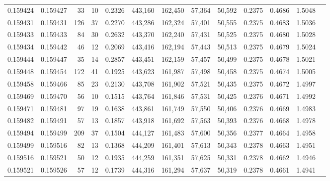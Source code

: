 \begin{tabular}{rrrrrrrrrrrrr}
0.159424 & 0.159427 &    33 &  10 &                                     0.2326 & 443,160 & 162,450 &  57,364 &  50,592 & 0.2375 & 0.4686 & 1.5048 \\
0.159431 & 0.159431 &   126 &  37 &                                     0.2270 & 443,286 & 162,324 &  57,401 &  50,555 & 0.2375 & 0.4683 & 1.5036 \\
0.159433 & 0.159433 &    84 &  30 &                                     0.2632 & 443,370 & 162,240 &  57,431 &  50,525 & 0.2375 & 0.4680 & 1.5028 \\
0.159434 & 0.159442 &    46 &  12 &                                     0.2069 & 443,416 & 162,194 &  57,443 &  50,513 & 0.2375 & 0.4679 & 1.5024 \\
0.159444 & 0.159447 &    35 &  14 &                                     0.2857 & 443,451 & 162,159 &  57,457 &  50,499 & 0.2375 & 0.4678 & 1.5021 \\
0.159448 & 0.159454 &   172 &  41 &                                     0.1925 & 443,623 & 161,987 &  57,498 &  50,458 & 0.2375 & 0.4674 & 1.5005 \\
0.159458 & 0.159466 &    85 &  23 &                                     0.2130 & 443,708 & 161,902 &  57,521 &  50,435 & 0.2375 & 0.4672 & 1.4997 \\
0.159469 & 0.159470 &    56 &  10 &                                     0.1515 & 443,764 & 161,846 &  57,531 &  50,425 & 0.2376 & 0.4671 & 1.4992 \\
0.159471 & 0.159481 &    97 &  19 &                                     0.1638 & 443,861 & 161,749 &  57,550 &  50,406 & 0.2376 & 0.4669 & 1.4983 \\
0.159482 & 0.159491 &    57 &  13 &                                     0.1857 & 443,918 & 161,692 &  57,563 &  50,393 & 0.2376 & 0.4668 & 1.4978 \\
0.159494 & 0.159499 &   209 &  37 &                                     0.1504 & 444,127 & 161,483 &  57,600 &  50,356 & 0.2377 & 0.4664 & 1.4958 \\
0.159499 & 0.159516 &    82 &  13 &                                     0.1368 & 444,209 & 161,401 &  57,613 &  50,343 & 0.2378 & 0.4663 & 1.4951 \\
0.159516 & 0.159521 &    50 &  12 &                                     0.1935 & 444,259 & 161,351 &  57,625 &  50,331 & 0.2378 & 0.4662 & 1.4946 \\
0.159521 & 0.159526 &    57 &  12 &                                     0.1739 & 444,316 & 161,294 &  57,637 &  50,319 & 0.2378 & 0.4661 & 1.4941 \\

\end{tabular}
